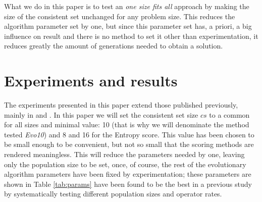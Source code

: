 \documentclass[conference]{IEEEtran}
\begin{document}
What we do in this paper is to test an {\em one size fits all} 
approach by making the size of the consistent set unchanged for any problem
size. This reduces the algorithm parameter set by one, but since this
parameter set has, a priori, a big influence on result and there is no
method to set it other than experimentation, it reduces greatly the
amount of generations needed to obtain a solution. 

\section{Experiments and results}
\label{sec:exp}

The experiments presented in this paper extend those published
previously, mainly in \cite{DBLP:conf/cec/GuervosMC11} and \cite{merelo12:gameon}.
In this paper we will set the consistent set size $cs$
to a common for all sizes and minimal value: 10 (that is why we will
denominate the method tested {\em Evo10}) and 8 and 16 for the
Entropy score. 
This value has been chosen to be small enough to be convenient, but not so small that the scoring methods are rendered meaningless. This will reduce the parameters
needed by one, leaving only the population size to be set, once, of
course, the rest of the evolutionary algorithm parameters have been
fixed by experimentation; these parameters are shown 
in Table \ref{tab:params} 
have been found to be the best in a previous
study by systematically testing different population sizes and
operator rates.  
\end{document}
